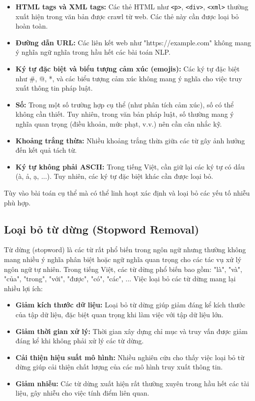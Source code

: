 \documentclass[../BTL.tex]{subfiles}
\begin{document}
\begin{itemize}
    \item \textbf{HTML tags và XML tags:} Các thẻ HTML như \texttt{<p>}, \texttt{<div>}, \texttt{<xml>} thường xuất hiện trong văn bản được crawl từ web. Các thẻ này cần được loại bỏ hoàn toàn.
    
    \item \textbf{Đường dẫn URL:} Các liên kết web như "https://example.com" không mang ý nghĩa ngữ nghĩa trong hầu hết các bài toán NLP.
    
    \item \textbf{Ký tự đặc biệt và biểu tượng cảm xúc (emojis):} Các ký tự đặc biệt như \#, @, *, và các biểu tượng cảm xúc không mang ý nghĩa cho việc truy xuất thông tin pháp luật.
    
    \item \textbf{Số:} Trong một số trường hợp cụ thể (như phân tích cảm xúc), số có thể không cần thiết. Tuy nhiên, trong văn bản pháp luật, số thường mang ý nghĩa quan trọng (điều khoản, mức phạt, v.v.) nên cần cân nhắc kỹ.
    
    \item \textbf{Khoảng trắng thừa:} Nhiều khoảng trắng thừa giữa các từ gây ảnh hưởng đến kết quả tách từ.
    
    \item \textbf{Ký tự không phải ASCII:} Trong tiếng Việt, cần giữ lại các ký tự có dấu (à, ả, ạ, ...). Tuy nhiên, các ký tự đặc biệt khác cần được loại bỏ.
\end{itemize}

Tùy vào bài toán cụ thể mà có thể linh hoạt xác định và loại bỏ các yếu tố nhiễu phù hợp.

\subsection{Loại bỏ từ dừng (Stopword Removal)}
Từ dừng (stopword) là các từ rất phổ biến trong ngôn ngữ nhưng thường không mang nhiều ý nghĩa phân biệt hoặc ngữ nghĩa quan trọng cho các tác vụ xử lý ngôn ngữ tự nhiên. Trong tiếng Việt, các từ dừng phổ biến bao gồm: "là", "và", "của", "trong", "với", "được", "có", "các", ... Việc loại bỏ các từ dừng mang lại nhiều lợi ích:

\begin{itemize}
    \item \textbf{Giảm kích thước dữ liệu:} Loại bỏ từ dừng giúp giảm đáng kể kích thước của tập dữ liệu, đặc biệt quan trọng khi làm việc với tập dữ liệu lớn.
    
    \item \textbf{Giảm thời gian xử lý:} Thời gian xây dựng chỉ mục và truy vấn được giảm đáng kể khi không phải xử lý các từ dừng.
    
    \item \textbf{Cải thiện hiệu suất mô hình:} Nhiều nghiên cứu cho thấy việc loại bỏ từ dừng giúp cải thiện chất lượng của các mô hình truy xuất thông tin.
    
    \item \textbf{Giảm nhiễu:} Các từ dừng xuất hiện rất thường xuyên trong hầu hết các tài liệu, gây nhiễu cho việc tính điểm liên quan.
\end{itemize}
\end{document}
